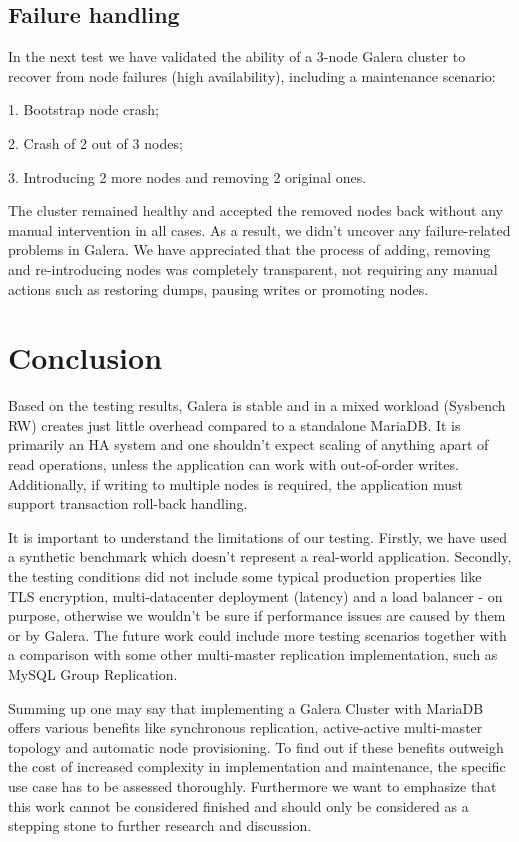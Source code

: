 \documentclass{sig-alternate}
\begin{document}
\subsection{Failure handling}

In the next test we have validated the ability of a 3-node Galera cluster to recover from node failures (high availability), including a maintenance scenario:

1. Bootstrap node crash;

2. Crash of 2 out of 3 nodes;

3. Introducing 2 more nodes and removing 2 original ones.

The cluster remained healthy and accepted the removed nodes back without any manual intervention in all cases. As a result, we didn't uncover any failure-related problems in Galera. We have appreciated that the process of adding, removing and re-introducing nodes was completely transparent, not requiring any manual actions such as restoring dumps, pausing writes or promoting nodes.

\section{Conclusion}
Based on the testing results, Galera is stable and in a mixed workload (Sysbench RW) creates just little overhead compared to a standalone MariaDB. It is primarily an HA system and one shouldn't expect scaling of anything apart of read operations, unless the application can work with out-of-order writes. Additionally, if writing to multiple nodes is required, the application must support transaction roll-back handling.

It is important to understand the limitations of our testing. Firstly, we have used a synthetic benchmark which doesn't represent a real-world application. Secondly, the testing conditions did not include some typical production properties like TLS encryption, multi-datacenter deployment (latency) and a load balancer - on purpose, otherwise we wouldn't be sure if performance issues are caused by them or by Galera. The future work could include more testing scenarios together with a comparison with some other multi-master replication implementation, such as MySQL Group Replication.

Summing up one may say that implementing a Galera Cluster with MariaDB offers various benefits like synchronous replication, active-active multi-master topology and automatic node provisioning. To find out if these benefits outweigh the cost of increased complexity in implementation and maintenance, the specific use case has to be assessed thoroughly. Furthermore we want to emphasize that this work cannot be considered finished and should only be considered as a stepping stone to further research and discussion.
\end{document}
